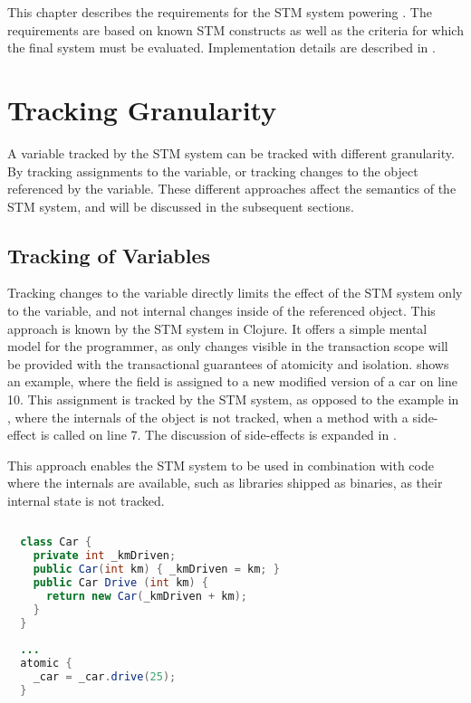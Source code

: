 \makeatletter {}\makeatother
{}
This chapter describes the requirements for the \ac{STM} system powering \stmname. The requirements are based on known \ac{STM} constructs as well as the criteria for which the final system must be evaluated. Implementation details are described in .
\label{sec:stm_requirements}

\section{Tracking Granularity}
A variable tracked by the \ac{STM} system can be tracked with different granularity. By tracking assignments to the variable, or tracking changes to the object referenced by the variable. These different approaches affect the semantics of the \ac{STM} system, and will be discussed in the subsequent sections.

\subsection{Tracking of Variables} 
Tracking changes to the variable directly limits the effect of the \ac{STM} system only to the variable, and not internal changes inside of the referenced object. This approach is known by the \ac{STM} system in Clojure\cite{clojureConcurrent}. It offers a simple mental model for the programmer, as only changes visible in the transaction scope will be provided with the transactional guarantees of atomicity and isolation.   shows an example, where the field  is assigned to a new modified version of a car on line 10. This assignment is tracked by the \ac{STM} system, as opposed to the example in , where the internals of the object is not tracked, when a method with a side-effect is called on line 7. The discussion of side-effects is expanded in .

This approach enables the \ac{STM} system to be used in combination with code where the internals are available, such as libraries shipped as binaries, as their internal state is not tracked.
\begin{lstlisting}[label=lst:tracking_variable,
  float,
  caption={Tracking Assignment to Variables},
  language=Java,  
  showspaces=false,
  showtabs=false,
  breaklines=true,
  showstringspaces=false,
  breakatwhitespace=true,
  commentstyle=\color{greencomments},
  keywordstyle=\color{bluekeywords},
  stringstyle=\color{redstrings},
  morekeywords={atomic, retry, orElse, var, get, set}]  % Start your code-block
  
  class Car {
    private int _kmDriven;
    public Car(int km) { _kmDriven = km; }
    public Car Drive (int km) { 
      return new Car(_kmDriven + km); 
    }
  }
  
  ...
  atomic {
    _car = _car.drive(25);
  }
\end{lstlisting}


